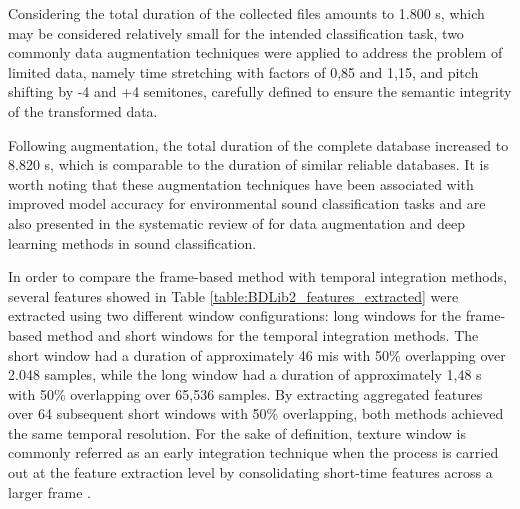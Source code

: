 Considering the total duration of the collected files amounts to 1.800 \gls{s}, which may be considered relatively small for the intended classification task, two commonly data augmentation techniques were applied to address the problem of limited data, namely time stretching with factors of 0,85 and 1,15, and pitch shifting by -4 and +4 semitones, carefully defined to ensure the semantic integrity of the transformed data. 

Following augmentation, the total duration of the complete database increased to 8.820 \gls{s}, which is comparable to the duration of similar reliable databases. It is worth noting that these augmentation techniques have been associated with improved model accuracy for environmental sound classification tasks \cite{Salamon2017} and are also presented in the systematic review of \textcite{Alli2022} for data augmentation and deep learning methods in sound classification.

In order to compare the frame-based method with temporal integration methods, several features showed in Table \ref{table:BDLib2_features_extracted} were extracted using two different window configurations: long windows for the frame-based method and short windows for the temporal integration methods. The short window had a duration of approximately 46 \gls{mi}\gls{s} with 50\% overlapping over 2.048 samples, while the long window had a duration of approximately 1,48 \gls{s} with 50\% overlapping over 65,536 samples. By extracting aggregated features over 64 subsequent short windows with 50\% overlapping, both methods achieved the same temporal resolution. For the sake of definition, 
texture window is commonly referred as an early integration technique when the process is carried out at the feature extraction level by consolidating short-time features across a larger frame \cite{Bountourakis2019}.


